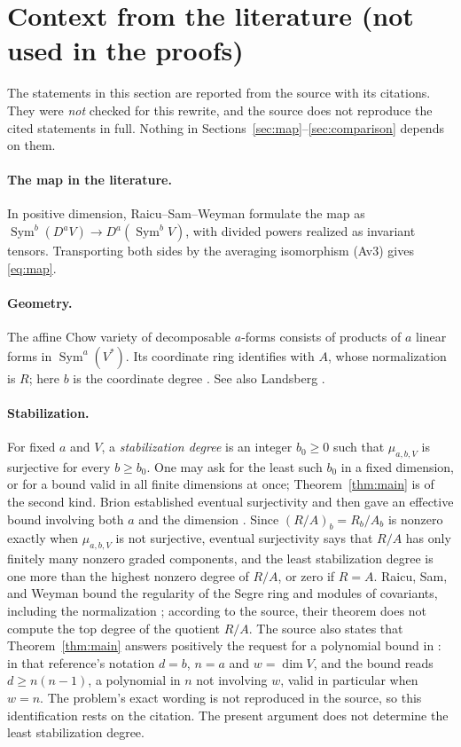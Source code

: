 \documentclass[11pt]{article}
\theoremstyle{remark}
\DeclareMathOperator{\Sym}{Sym}
\begin{document}
\section{Context from the literature (not used in the proofs)}
\label{sec:context}

The statements in this section are reported from the source with its
citations. They were \emph{not} checked for this rewrite, and the source
does not reproduce the cited statements in full. Nothing in
Sections~\ref{sec:map}--\ref{sec:comparison} depends on them.

\paragraph{The map in the literature.}
In positive dimension, Raicu--Sam--Weyman \cite[Section~2]{RSW} formulate
the map as $\Sym^b(D^aV)\longrightarrow D^a(\Sym^bV)$, with divided powers
realized as invariant tensors. Transporting both sides by the averaging
isomorphism (Av3) gives \eqref{eq:map}.

\paragraph{Geometry.}
The affine Chow variety of decomposable $a$-forms consists of products of
$a$ linear forms in $\Sym^a(V^*)$. Its coordinate ring identifies with $A$,
whose normalization is $R$; here $b$ is the coordinate degree
\cite[Section~2, Theorem~2.3]{RSW}. See also Landsberg
\cite[Section~7.6, Propositions~7.11--7.12]{Landsberg}.

\paragraph{Stabilization.}
For fixed $a$ and $V$, a \emph{stabilization degree} is an integer
$b_0\ge0$ such that $\mu_{a,b,V}$ is surjective for every $b\ge b_0$. One
may ask for the least such $b_0$ in a fixed dimension, or for a bound valid
in all finite dimensions at once; Theorem~\ref{thm:main} is of the second
kind. Brion established eventual surjectivity \cite{Brion1993} and then
gave an effective bound involving both $a$ and the dimension
\cite[Theorem~3.3]{Brion}. Since $(R/A)_b=R_b/A_b$ is nonzero exactly when
$\mu_{a,b,V}$ is not surjective, eventual surjectivity says that $R/A$ has
only finitely many nonzero graded components, and the least stabilization
degree is one more than the highest nonzero degree of $R/A$, or zero if
$R=A$. Raicu, Sam, and Weyman bound the regularity of the Segre ring and
modules of covariants, including the normalization
\cite[Theorem~3.9]{RSW}; according to the source, their theorem does not
compute the top degree of the quotient $R/A$. The source also states that
Theorem~\ref{thm:main} answers positively the request for a polynomial
bound in \cite[Problem~7.19]{Landsberg}: in that reference's notation
$d=b$, $n=a$ and $w=\dim V$, and the bound reads $d\ge n(n-1)$, a
polynomial in $n$ not involving $w$, valid in particular when $w=n$. The
problem's exact wording is not reproduced in the source, so this
identification rests on the citation. The present argument does not
determine the least stabilization degree.
\end{document}
